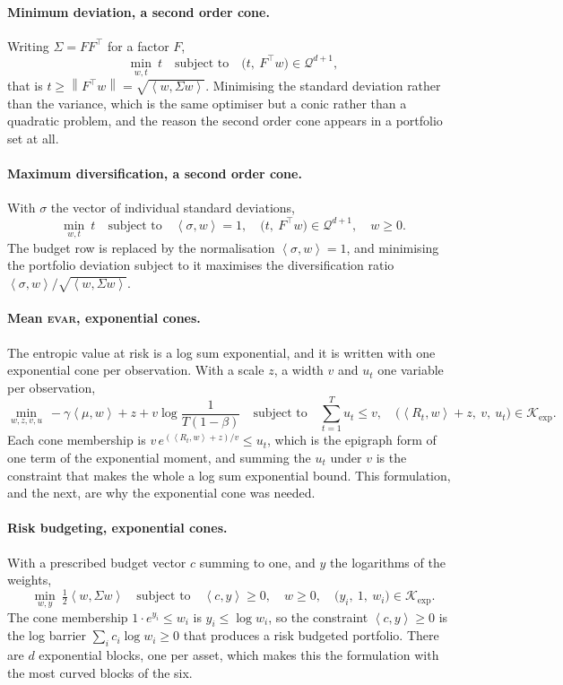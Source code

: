 \documentclass[a4paper,11pt]{book}
\theoremstyle{plain}
\theoremstyle{definition}
\theoremstyle{remark}
\numberwithin{equation}{chapter}
\numberwithin{algorithm}{chapter}
\newcommand{\norm}[1]{\left\|#1\right\|}
\newcommand{\inner}[2]{\left\langle #1, #2 \right\rangle}
\newcommand{\Kexp}{\mathcal{K}_{\exp}}
\begin{document}
	\paragraph{Minimum deviation, a second order cone.}
	Writing $\Sigma=FF^{\top}$ for a factor $F$,
	\[
	\min_{w,t}\ t
	\quad\text{subject to}\quad
	\bigl(t,\ F^{\top}w\bigr)\in\mathcal{Q}^{d+1} ,
	\]
	that is $t\geq\norm{F^{\top}w}=\sqrt{\inner{w}{\Sigma w}}$. Minimising the
	standard deviation rather than the variance, which is the same optimiser but
	a conic rather than a quadratic problem, and the reason the second order cone
	appears in a portfolio set at all.

	\paragraph{Maximum diversification, a second order cone.}
	With $\sigma$ the vector of individual standard deviations,
	\[
	\min_{w,t}\ t
	\quad\text{subject to}\quad
	\inner{\sigma}{w}=1,
	\quad
	\bigl(t,\ F^{\top}w\bigr)\in\mathcal{Q}^{d+1},
	\quad w\geq0 .
	\]
	The budget row is replaced by the normalisation $\inner{\sigma}{w}=1$, and
	minimising the portfolio deviation subject to it maximises the
	diversification ratio $\inner{\sigma}{w}/\sqrt{\inner{w}{\Sigma w}}$.

	\paragraph{Mean \textsc{evar}, exponential cones.}
	The entropic value at risk is a log sum exponential, and it is written with
	one exponential cone per observation. With a scale $z$, a width $v$ and
	$u_t$ one variable per observation,
	\[
	\min_{w,z,v,u}\ -\gamma\inner{\mu}{w}+z
	+v\log\frac{1}{T(1-\beta)}
	\quad\text{subject to}\quad
	\sum_{t=1}^{T}u_t\leq v,
	\quad
	\bigl(\inner{R_t}{w}+z,\ v,\ u_t\bigr)\in\Kexp .
	\]
	Each cone membership is $v\,e^{(\inner{R_t}{w}+z)/v}\leq u_t$, which is the
	epigraph form of one term of the exponential moment, and summing the $u_t$
	under $v$ is the constraint that makes the whole a log sum exponential bound.
	This formulation, and the next, are why the exponential cone was needed.

	\paragraph{Risk budgeting, exponential cones.}
	With a prescribed budget vector $c$ summing to one, and $y$ the logarithms of
	the weights,
	\[
	\min_{w,y}\ \tfrac12\inner{w}{\Sigma w}
	\quad\text{subject to}\quad
	\inner{c}{y}\geq0,
	\quad w\geq0,
	\quad
	\bigl(y_i,\ 1,\ w_i\bigr)\in\Kexp .
	\]
	The cone membership $1\cdot e^{y_i}\leq w_i$ is $y_i\leq\log w_i$, so the
	constraint $\inner{c}{y}\geq0$ is the log barrier
	$\sum_ic_i\log w_i\geq0$ that produces a risk budgeted portfolio. There are
	$d$ exponential blocks, one per asset, which makes this the formulation with
	the most curved blocks of the six.
\end{document}
